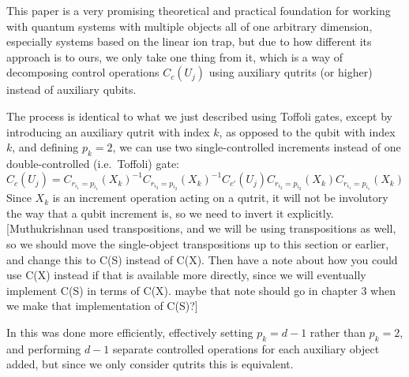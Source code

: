 This paper is a very promising theoretical and practical foundation for working with quantum systems with multiple objects all of one arbitrary dimension, especially systems based on the linear ion trap, but due to how different its approach is to ours, we only take one thing from it, which is a way of decomposing control operations $C_c(U_j)$ using auxiliary qutrits (or higher) instead of auxiliary qubits.

The process is identical to what we just described using Toffoli gates, except by introducing an auxiliary qutrit with index $k$, as opposed to the qubit with index $k$, and defining $p_k = 2$, we can use two single-controlled increments instead of one double-controlled (i.e.\ Toffoli) gate:
\[
C_c(U_j) = C_{r_{i_1}=p_{i_1}}(X_k)^{-1}
C_{r_{i_2}=p_{i_2}}(X_k)^{-1}
C_{c'}(U_j)
C_{r_{i_2}=p_{i_2}}(X_k)
C_{r_{i_1}=p_{i_1}}(X_k)
\]
Since $X_k$ is an increment operation acting on a qutrit, it will not be involutory the way that a qubit increment is, so we need to invert it explicitly. [Muthukrishnan used transpositions, and we will be using transpositions as well, so we should move the single-object transpositions up to this section or earlier, and change this to C(S) instead of C(X). Then have a note about how you could use C(X) instead if that is available more directly, since we will eventually implement C(S) in terms of C(X). maybe that note should go in chapter 3 when we make that implementation of C(S)?]

In \cite{multi-valued-logic} this was done more efficiently, effectively setting $p_k = d-1$ rather than $p_k = 2$, and performing $d-1$ separate controlled operations for each auxiliary object added, but since we only consider qutrits this is equivalent.
